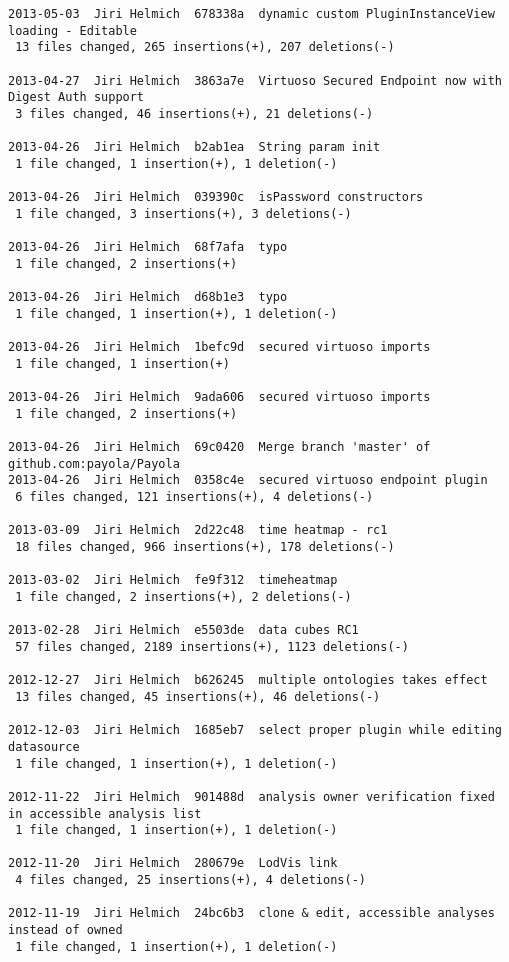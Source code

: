 {\begin{verbatim}
2013-05-03  Jiri Helmich  678338a  dynamic custom PluginInstanceView loading - Editable
 13 files changed, 265 insertions(+), 207 deletions(-)

2013-04-27  Jiri Helmich  3863a7e  Virtuoso Secured Endpoint now with Digest Auth support
 3 files changed, 46 insertions(+), 21 deletions(-)

2013-04-26  Jiri Helmich  b2ab1ea  String param init
 1 file changed, 1 insertion(+), 1 deletion(-)

2013-04-26  Jiri Helmich  039390c  isPassword constructors
 1 file changed, 3 insertions(+), 3 deletions(-)

2013-04-26  Jiri Helmich  68f7afa  typo
 1 file changed, 2 insertions(+)

2013-04-26  Jiri Helmich  d68b1e3  typo
 1 file changed, 1 insertion(+), 1 deletion(-)

2013-04-26  Jiri Helmich  1befc9d  secured virtuoso imports
 1 file changed, 1 insertion(+)

2013-04-26  Jiri Helmich  9ada606  secured virtuoso imports
 1 file changed, 2 insertions(+)

2013-04-26  Jiri Helmich  69c0420  Merge branch 'master' of github.com:payola/Payola
2013-04-26  Jiri Helmich  0358c4e  secured virtuoso endpoint plugin
 6 files changed, 121 insertions(+), 4 deletions(-)

2013-03-09  Jiri Helmich  2d22c48  time heatmap - rc1
 18 files changed, 966 insertions(+), 178 deletions(-)

2013-03-02  Jiri Helmich  fe9f312  timeheatmap
 1 file changed, 2 insertions(+), 2 deletions(-)

2013-02-28  Jiri Helmich  e5503de  data cubes RC1
 57 files changed, 2189 insertions(+), 1123 deletions(-)

2012-12-27  Jiri Helmich  b626245  multiple ontologies takes effect
 13 files changed, 45 insertions(+), 46 deletions(-)

2012-12-03  Jiri Helmich  1685eb7  select proper plugin while editing datasource
 1 file changed, 1 insertion(+), 1 deletion(-)

2012-11-22  Jiri Helmich  901488d  analysis owner verification fixed in accessible analysis list
 1 file changed, 1 insertion(+), 1 deletion(-)

2012-11-20  Jiri Helmich  280679e  LodVis link
 4 files changed, 25 insertions(+), 4 deletions(-)

2012-11-19  Jiri Helmich  24bc6b3  clone & edit, accessible analyses instead of owned
 1 file changed, 1 insertion(+), 1 deletion(-)


\end{verbatim}}
